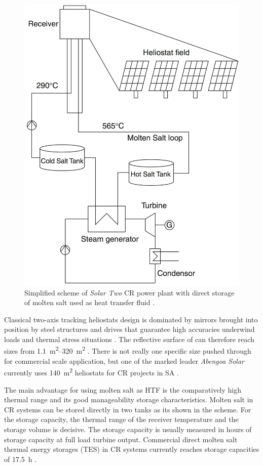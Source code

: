 \begin{figure}[htbp]  
\centering
\includegraphics[width=0.45\linewidth]{FIG/towerdirecttwotank}
\caption[Simplified scheme of \emph{Solar Two} CR power plant with direct storage of molten salt used as heat transfer fluid.]{Simplified scheme of \emph{Solar Two} CR power plant with direct storage of molten salt used as heat transfer fluid \cite{Richter2013}.}\label{towerdirecttwotank}
\end{figure}

Classical two-axis tracking heliostats design is dominated by mirrors brought into position by steel structures and drives that guarantee high accuracies underwind loads and thermal stress situations \cite{Alexopoulos2013}. The reflective surface of can therefore reach sizes from \SIrange{1.1}{320}{\square\metre} \cite{Blackmon2012,Tyner2014}. There is not really one specific size pushed through for commercial scale application, but one of the marked leader \emph{Abengoa Solar} currently uses \SI{140}{\square\metre} heliostats for CR projects in SA \cite{Abengoa2014}.

The main advantage for using molten salt as HTF is the comparatively high thermal range and its good manageability storage characteristics. Molten salt in CR systems can be stored directly in two tanks as its shown in the scheme. For the storage capacity, the thermal range of the receiver temperature and the storage volume is decisive. The storage capacity is usually measured in hours of storage capacity at full load turbine output. Commercial direct molten salt thermal energy storages (TES) in CR systems currently reaches storage capacities of \SI{17.5}{\hour} \cite{NREL2015b}.

